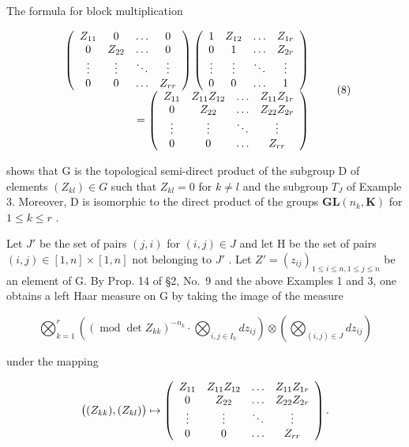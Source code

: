 The formula for block multiplication

\[
\begin{array}{r} \left( \begin{array}{c c c c} Z _ {1 1} & 0 & \ldots & 0 \\ 0 & Z _ {2 2} & \ldots & 0 \\ \vdots & \vdots & \ddots & \vdots \\ 0 & 0 & \ldots & Z _ {r r} \end{array} \right) \left( \begin{array}{c c c c} 1 & Z _ {1 2} & \ldots & Z _ {1 r} \\ 0 & 1 & \ldots & Z _ {2 r} \\ \vdots & \vdots & \ddots & \vdots \\ 0 & 0 & \ldots & 1 \end{array} \right) \\ = \left( \begin{array}{c c c c} Z _ {1 1} & Z _ {1 1} Z _ {1 2} & \ldots & Z _ {1 1} Z _ {1 r} \\ 0 & Z _ {2 2} & \ldots & Z _ {2 2} Z _ {2 r} \\ \vdots & \vdots & \ddots & \vdots \\ 0 & 0 & \ldots & Z _ {r r} \end{array} \right) \end{array}\tag{8}
\]

shows that G is the topological semi-direct product of the subgroup D of elements \((Z_{kl}) \in G\) such that \(Z_{kl} = 0\) for \(k \neq l\) and the subgroup \(T_{J}\) of Example 3. Moreover, D is isomorphic to the direct product of the groups \(\mathbf{GL}(n_{k}, \mathbf{K})\) for \(1 \leqslant k \leqslant r\) .

Let \(J'\) be the set of pairs \((j, i)\) for \((i, j) \in J\) and let H be the set of pairs \((i, j) \in [1, n] \times [1, n]\) not belonging to \(J'\) . Let \(Z' = (z_{ij})_{1 \leqslant i \leqslant n, 1 \leqslant j \leqslant n}\) be an element of G. By Prop. 14 of §2, No.~9 and the above Examples 1 and 3, one obtains a left Haar measure on G by taking the image of the measure

\[
\bigotimes_ {k = 1} ^ {r} \left(\left(\operatorname{mod} \det Z _ {k k}\right) ^ {- n _ {k}} \cdot \bigotimes_ {i, j \in I _ {k}} d z _ {i j}\right) \otimes \left(\bigotimes_ {(i, j) \in J} d z _ {i j}\right)
\]

under the mapping

\[
\bigl ((Z _ {k k}), (Z _ {k l}) \bigr) \mapsto \left( \begin{array}{c c c c} Z _ {1 1} & Z _ {1 1} Z _ {1 2} & \ldots & Z _ {1 1} Z _ {1 r} \\ 0 & Z _ {2 2} & \ldots & Z _ {2 2} Z _ {2 r} \\ \vdots & \vdots & \ddots & \vdots \\ 0 & 0 & \ldots & Z _ {r r} \end{array} \right).
\]

